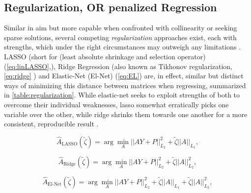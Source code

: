 \subsection{Regularization, OR penalized Regression}
\label{sec:reg}
Similar in aim but more capable when confronted with collinearity or seeking sparse solutions, several competing \emph{regularization} approaches exist, each with strengths, which under the right circumstances may outweigh any limitations \citep[p.69-73,661-668]{friedman2001elements}. LASSO (short for (least absolute shrinkage and selection operator) (\cref{eq:linLASSO},\citep{tibshirani1996regression}), Ridge Regression (also known as Tikhonov regularization, \cref{eq:ridge} \citep{hoerl1970ridge}) and Elastic-Net (El-Net) (\cref{eq:EL}\citep{zou2005regularization}) are, in effect, similar but distinct ways of minimizing this distance between matrices when regressing, summarized in \cref{table:regularization}. While elastic-net seeks to exploit strengths of both to overcome their individual weaknesses, lasso somewhat erratically picks one variable over the other, while ridge shrinks them towards one another for a more consistent, reproducible result \citep{ng2004feature,tibshirani1996regression}.

 \begin{equation}\label{eq:linLASSO}
  \hat{A}_{\textrm{LASSO}}(\tilde{\zeta}) = \arg \min_{A} ||A Y+P||^2_{L_2} + \tilde{\zeta} ||A||_{L_1},
\end{equation}

 \begin{equation}\label{eq:ridge}
  \hat{A}_{\textrm{Ridge}}(\tilde{\zeta}) = \arg \min_{A} ||A Y+P||^2_{L_2} + \tilde{\zeta} ||A||^2_{L_2},
\end{equation}

 \begin{equation}\label{eq:EL}
  \hat{A}_{\textrm{El-Net}}(\tilde{\zeta}) = \arg \min_{A} ||A Y+P||^2_{L_2} + \tilde{\zeta} ||A||_{L_1}+ \tilde{\zeta} ||A||^2_{L_2},
\end{equation}

